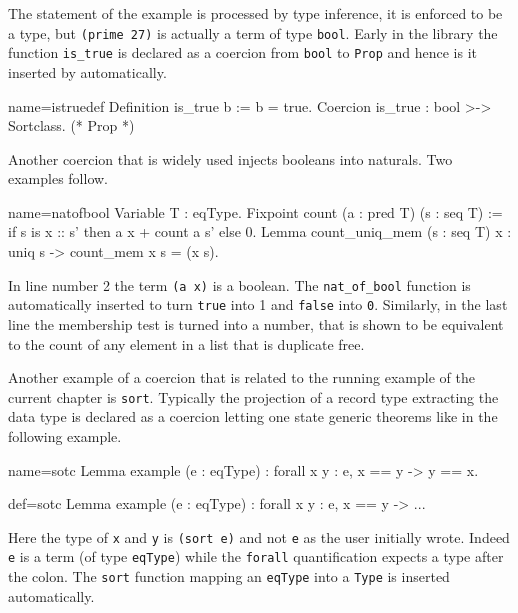 The statement of the example is processed by type inference,
it is enforced to be a type, but \lstinline/(prime 27)/ is actually
a term of type \lstinline/bool/.  Early in the library the
function \lstinline/is_true/ is declared as a coercion from
\lstinline/bool/ to \lstinline/Prop/ and hence is it inserted
by \Coq{} automatically.

\begin{coq}{name=istruedef}{}
Definition is_true b := b = true.
Coercion is_true : bool >-> Sortclass. (* Prop *)
\end{coq}

Another coercion that is widely used injects booleans into naturals.
Two examples follow.

\begin{coq}{name=natofbool}{}
Variable T : eqType.
Fixpoint count (a : pred T) (s : seq T) :=
  if s is x :: s' then a x + count a s' else 0.
Lemma count_uniq_mem (s : seq T) x :
  uniq s -> count_mem x s = (x \in s).
\end{coq}

In line number 2 the term \lstinline/(a x)/ is a boolean.  The
\lstinline/nat_of_bool/ function is automatically inserted to turn
\lstinline/true/ into 1 and \lstinline/false/ into \lstinline/0/.
Similarly, in the last line the membership test is turned into
a number, that is shown to be equivalent to the count of any
element in a list that is duplicate free.

Another example of a coercion that is related to the running example
of the current chapter is \lstinline/sort/.  Typically the projection
of a record type extracting the data type is declared as a coercion
letting one state generic theorems like in the following example.

\begin{coqdef}{name=sotc}
Lemma example (e : eqType) : forall x y : e, x == y -> y == x.
\end{coqdef}
\begin{coq}{def=sotc}{}
Lemma example (e : eqType) : forall x y : e, x == y -> ...
\end{coq}

Here the type of \lstinline/x/ and \lstinline/y/ is
\lstinline/(sort e)/ and not \lstinline/e/ as the user initially wrote.
Indeed \lstinline/e/ is a term (of type \lstinline/eqType/) while
the \lstinline/forall/ quantification expects a type after the
colon.  The \lstinline/sort/ function mapping an \lstinline/eqType/
into a \lstinline/Type/ is inserted automatically.

